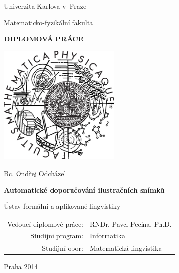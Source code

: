 \documentclass[12pt,a4paper]{report}
\begin{document}
\pagestyle{empty}
\begin{center}

\large

Univerzita Karlova v~Praze

\medskip

Matematicko-fyzikální fakulta

\vfill

{\bf\Large DIPLOMOVÁ PRÁCE}

\vfill

\centerline{\mbox{\includegraphics[width=60mm]{logo.eps}}}

\vfill
\vspace{5mm}

{\LARGE Bc. Ondřej Odcházel}

\vspace{15mm}

{\LARGE\bfseries Automatické doporučování ilustračních snímků}

\vfill

Ústav formální a aplikované lingvistiky

\vfill

\begin{tabular}{rl}

Vedoucí diplomové práce: & RNDr. Pavel Pecina, Ph.D. \\
\noalign{\vspace{2mm}}
Studijní program: & Informatika \\
\noalign{\vspace{2mm}}
Studijní obor: & Matematická lingvistika \\
\end{tabular}

\vfill

Praha 2014

\end{center}
\end{document}

